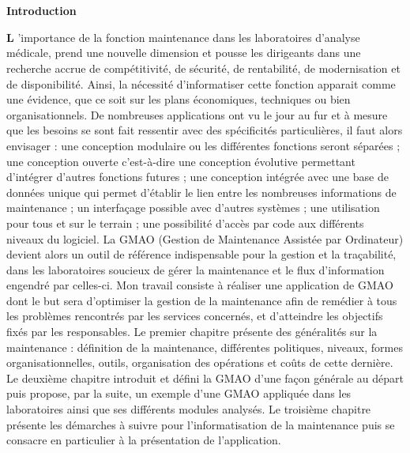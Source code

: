 \chapter*{}
\begin{center}
    \large\textbf{Introduction}
\end{center}
\lettrine[findent=2pt]{{\textbf{L}}}{ }’importance de la fonction maintenance dans les laboratoires d’analyse médicale, prend une nouvelle dimension et pousse les dirigeants dans une recherche accrue de compétitivité, de sécurité, de rentabilité, de modernisation et de disponibilité.
Ainsi, la nécessité d’informatiser cette fonction apparait comme une évidence, que ce soit sur les plans économiques, techniques ou bien organisationnels.
De nombreuses applications ont vu le jour au fur et à mesure que les besoins se sont fait ressentir avec des spécificités particulières, il faut alors envisager : une conception modulaire ou les différentes fonctions seront séparées ; une conception ouverte c'est-à-dire une conception évolutive permettant d’intégrer d’autres fonctions futures ; une conception intégrée avec une base de données unique qui permet d’établir le lien entre les nombreuses informations de maintenance ; un interfaçage possible avec d’autres systèmes ; une utilisation pour tous et sur le terrain ; une possibilité d’accès par code aux différents niveaux du logiciel. 
La GMAO (Gestion de Maintenance Assistée par Ordinateur) devient alors un outil de référence indispensable pour la gestion et la traçabilité, dans les laboratoires soucieux de gérer la maintenance et le flux d’information engendré par celles-ci.
Mon travail consiste à réaliser une application de GMAO dont le but sera d’optimiser la gestion de la maintenance afin de remédier à tous les problèmes rencontrés par les services concernés, et d’atteindre les objectifs fixés par les responsables.
Le premier chapitre présente des généralités sur la maintenance : définition de la maintenance, différentes politiques, niveaux, formes organisationnelles, outils, organisation des opérations et coûts de cette dernière. 
Le deuxième chapitre introduit et défini la GMAO d’une façon générale au départ puis propose, par la suite, un exemple d’une GMAO appliquée dans les laboratoires ainsi que ses différents modules analysés.
Le troisième chapitre présente les démarches à suivre pour l’informatisation de la maintenance puis se consacre en particulier à la présentation de l’application.
\thispagestyle{empty}